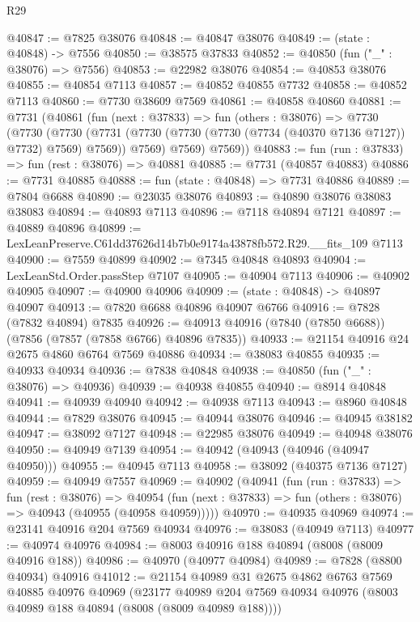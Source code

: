 \begin{lexlean}{R29}
\begin{coremodule}
@40847 := @7825 @38076
@40848 := @40847 @38076
@40849 := (state : @40848) -> @7556
@40850 := @38575 @37833
@40852 := @40850 (fun ("_" : @38076) => @7556)
@40853 := @22982 @38076
@40854 := @40853 @38076
@40855 := @40854 @7113
@40857 := @40852 @40855 @7732
@40858 := @40852 @7113
@40860 := @7730 @38609 @7569
@40861 := @40858 @40860
@40881 := @7731
    (@40861
      (fun (next : @37833) =>
      fun (others : @38076) =>
      @7730
        (@7730
          (@7730
            (@7731 (@7730 (@7730 (@7730 (@7734 (@40370 @7136 @7127)) @7732) @7569) @7569))
            @7569)
          @7569)
        @7569))
@40883 := fun (run : @37833) => fun (rest : @38076) => @40881
@40885 := @7731 (@40857 @40883)
@40886 := @7731 @40885
@40888 := fun (state : @40848) => @7731 @40886
@40889 := @7804 @6688
@40890 := @23035 @38076
@40893 := @40890 @38076 @38083 @38083
@40894 := @40893 @7113
@40896 := @7118 @40894 @7121
@40897 := @40889 @40896
@40899 := LexLeanPreserve.C61dd37626d14b7b0e9174a43878fb572.R29.__fits_109 @7113
@40900 := @7559 @40899
@40902 := @7345 @40848 @40893
@40904 := LexLeanStd.Order.passStep @7107
@40905 := @40904 @7113
@40906 := @40902 @40905
@40907 := @40900 @40906
@40909 := (state : @40848) -> @40897 @40907
@40913 := @7820 @6688 @40896 @40907 @6766
@40916 := @7828 (@7832 @40894) @7835
@40926 := @40913 @40916 (@7840 (@7850 @6688)) (@7856 (@7857 (@7858 @6766) @40896 @7835))
@40933 := @21154 @40916 @24 @2675 @4860 @6764 @7569 @40886
@40934 := @38083 @40855
@40935 := @40933 @40934
@40936 := @7838 @40848
@40938 := @40850 (fun ("_" : @38076) => @40936)
@40939 := @40938 @40855
@40940 := @8914 @40848
@40941 := @40939 @40940
@40942 := @40938 @7113
@40943 := @8960 @40848
@40944 := @7829 @38076
@40945 := @40944 @38076
@40946 := @40945 @38182
@40947 := @38092 @7127
@40948 := @22985 @38076
@40949 := @40948 @38076
@40950 := @40949 @7139
@40954 := @40942 (@40943 (@40946 (@40947 @40950)))
@40955 := @40945 @7113
@40958 := @38092 (@40375 @7136 @7127)
@40959 := @40949 @7557
@40969 := @40902
    (@40941
      (fun (run : @37833) =>
      fun (rest : @38076) =>
      @40954 (fun (next : @37833) => fun (others : @38076) => @40943 (@40955 (@40958 @40959)))))
@40970 := @40935 @40969
@40974 := @23141 @40916 @204 @7569 @40934
@40976 := @38083 (@40949 @7113)
@40977 := @40974 @40976
@40984 := @8003 @40916 @188 @40894 (@8008 (@8009 @40916 @188))
@40986 := @40970 (@40977 @40984)
@40989 := @7828 (@8800 @40934) @40916
@41012 := @21154
    @40989
    @31
    @2675
    @4862
    @6763
    @7569
    @40885
    @40976
    @40969
    (@23177 @40989 @204 @7569 @40934 @40976 (@8003 @40989 @188 @40894 (@8008 (@8009 @40989 @188))))

\end{coremodule}
\end{lexlean}
